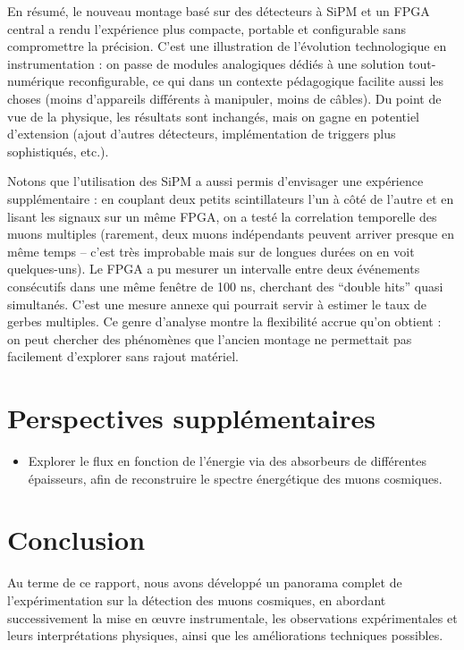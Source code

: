 \documentclass[a4paper,12pt,twoside]{article}
\begin{document}
En résumé, le nouveau montage basé sur des détecteurs à SiPM et un FPGA central a rendu l’expérience plus compacte, portable et configurable sans compromettre la précision. C’est une illustration de l’évolution technologique en instrumentation : on passe de modules analogiques dédiés à une solution tout-numérique reconfigurable, ce qui dans un contexte pédagogique facilite aussi les choses (moins d’appareils différents à manipuler, moins de câbles). Du point de vue de la physique, les résultats sont inchangés, mais on gagne en potentiel d’extension (ajout d’autres détecteurs, implémentation de triggers plus sophistiqués, etc.).

Notons que l’utilisation des SiPM a aussi permis d’envisager une expérience supplémentaire : en couplant deux petits scintillateurs l’un à côté de l’autre et en lisant les signaux sur un même FPGA, on a testé la correlation temporelle des muons multiples (rarement, deux muons indépendants peuvent arriver presque en même temps – c'est très improbable mais sur de longues durées on en voit quelques-uns). Le FPGA a pu mesurer un intervalle entre deux événements consécutifs dans une même fenêtre de 100 ns, cherchant des “double hits” quasi simultanés. C’est une mesure annexe qui pourrait servir à estimer le taux de gerbes multiples. Ce genre d’analyse montre la flexibilité accrue qu’on obtient : on peut chercher des phénomènes que l'ancien montage ne permettait pas facilement d'explorer sans rajout matériel.

\section{Perspectives supplémentaires}
\begin{itemize}
  \item Explorer le flux en fonction de l’énergie via des absorbeurs de différentes épaisseurs, afin de reconstruire le spectre énergétique des muons cosmiques.
\end{itemize}

\section{Conclusion}
Au terme de ce rapport, nous avons développé un panorama complet de l’expérimentation sur la détection des muons cosmiques, en abordant successivement la mise en œuvre instrumentale, les observations expérimentales et leurs interprétations physiques, ainsi que les améliorations techniques possibles.
\end{document}
